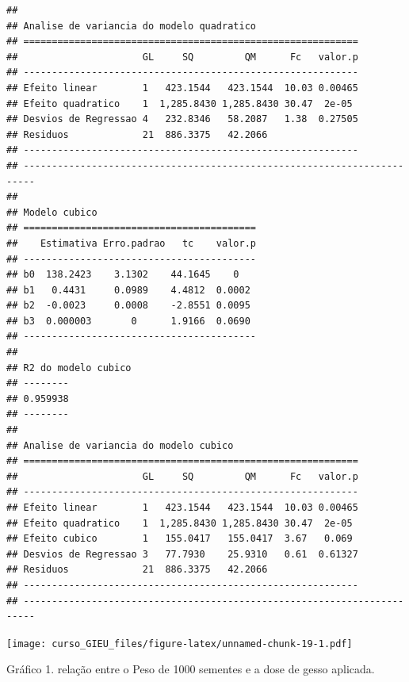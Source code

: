 \documentclass[
]{book}
\newenvironment{Shaded}{\begin{snugshade}}{\end{snugshade}}
\newcommand{\CommentTok}[1]{\textcolor[rgb]{0.56,0.35,0.01}{\textit{#1}}}
\newcommand{\DataTypeTok}[1]{\textcolor[rgb]{0.13,0.29,0.53}{#1}}
\newcommand{\DecValTok}[1]{\textcolor[rgb]{0.00,0.00,0.81}{#1}}
\newcommand{\FloatTok}[1]{\textcolor[rgb]{0.00,0.00,0.81}{#1}}
\newcommand{\KeywordTok}[1]{\textcolor[rgb]{0.13,0.29,0.53}{\textbf{#1}}}
\newcommand{\NormalTok}[1]{#1}
\newcommand{\OperatorTok}[1]{\textcolor[rgb]{0.81,0.36,0.00}{\textbf{#1}}}
\newcommand{\OtherTok}[1]{\textcolor[rgb]{0.56,0.35,0.01}{#1}}
\newcommand{\StringTok}[1]{\textcolor[rgb]{0.31,0.60,0.02}{#1}}
\begin{document}
\begin{verbatim}
## 
## Analise de variancia do modelo quadratico
## ===========================================================
##                      GL     SQ         QM      Fc   valor.p
## -----------------------------------------------------------
## Efeito linear        1   423.1544   423.1544  10.03 0.00465
## Efeito quadratico    1  1,285.8430 1,285.8430 30.47  2e-05 
## Desvios de Regressao 4   232.8346   58.2087   1.38  0.27505
## Residuos             21  886.3375   42.2066                
## -----------------------------------------------------------
## ------------------------------------------------------------------------
## 
## Modelo cubico
## =========================================
##    Estimativa Erro.padrao   tc    valor.p
## -----------------------------------------
## b0  138.2423    3.1302    44.1645    0   
## b1   0.4431     0.0989    4.4812  0.0002 
## b2  -0.0023     0.0008    -2.8551 0.0095 
## b3  0.000003       0      1.9166  0.0690 
## -----------------------------------------
## 
## R2 do modelo cubico
## --------
## 0.959938
## --------
## 
## Analise de variancia do modelo cubico
## ===========================================================
##                      GL     SQ         QM      Fc   valor.p
## -----------------------------------------------------------
## Efeito linear        1   423.1544   423.1544  10.03 0.00465
## Efeito quadratico    1  1,285.8430 1,285.8430 30.47  2e-05 
## Efeito cubico        1   155.0417   155.0417  3.67   0.069 
## Desvios de Regressao 3   77.7930    25.9310   0.61  0.61327
## Residuos             21  886.3375   42.2066                
## -----------------------------------------------------------
## ------------------------------------------------------------------------
\end{verbatim}

\begin{Shaded}
\end{Shaded}

\texttt{[image: curso\_GIEU\_files/figure-latex/unnamed-chunk-19-1.pdf]}

Gráfico 1. relação entre o Peso de 1000 sementes e a dose de gesso aplicada.

  
\end{document}
